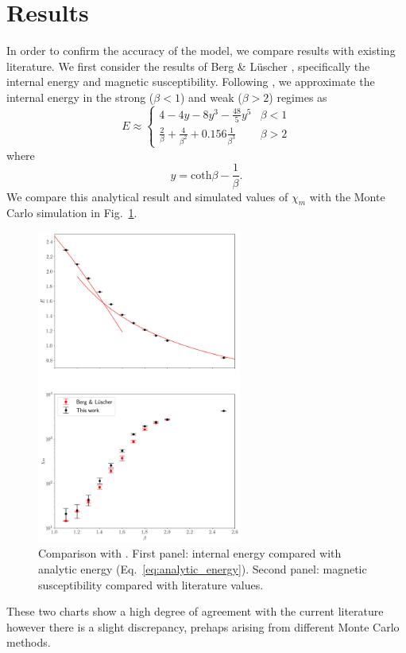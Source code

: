 \documentclass[a4paper,11pt]{article}
\begin{document}
\section{Results}
\label{sec:results}
In order to confirm the accuracy of the model, we compare results with existing literature. We first consider the results of Berg \& L\"uscher \cite{berg1981}, specifically the internal energy and magnetic susceptibility. Following \cite{berg1981}, we approximate the internal energy in the strong ($\beta<1$) and weak ($\beta>2$) regimes as
\begin{equation}
    \label{eq:analytic_energy}
E \approx \begin{cases}
    4-4y-8y^3-\frac{48}{5}y^5& \beta<1 \\
\frac{2}{\beta} + \frac{4}{\beta^2} + 0.156\frac{1}{\beta^3}& \beta>2
\end{cases}
\end{equation}
where
\begin{equation}
    y=\mathrm{coth}\beta-\frac{1}{\beta}.
\end{equation}
We compare this analytical result and simulated values of $\chi_m$ with the Monte Carlo simulation in Fig.~\ref{fig:bergluscher}.
\begin{figure}[h!]
    \centering
      \includegraphics[width=0.6\textwidth]{internal_energy.png}
      \caption{\label{fig:bergluscher}Comparison with \cite{berg1981}. First panel: internal energy compared with analytic  energy (Eq.~\ref{eq:analytic_energy}). Second panel: magnetic susceptibility compared with literature values.}
\end{figure}
These two charts show a high degree of agreement with the current literature however there is a slight discrepancy, prehaps arising from different Monte Carlo methods.
\end{document}
